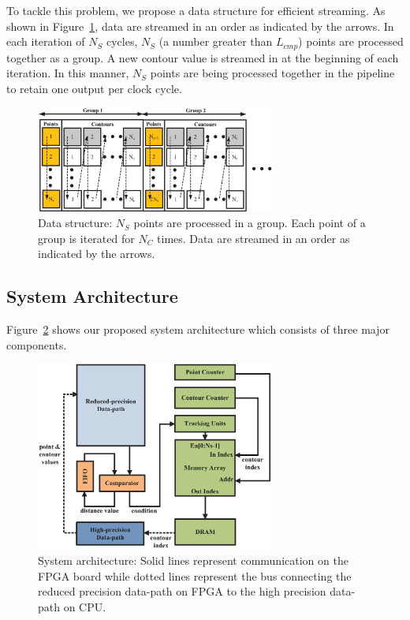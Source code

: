 To tackle this problem, we propose a data structure for efficient streaming.
As shown in Figure~\ref{fig:precision_stream}, data are streamed in an order as indicated by the arrows.
In each iteration of $N_S$ cycles, $N_{S}$ (a number greater than $L_{cmp}$) points are processed together as a group.
A new contour value is streamed in at the beginning of each iteration.
In this manner, $N_{S}$ points are being processed together in the pipeline to retain one output per clock cycle.

\begin{figure}[ht]
\begin{center}
\includegraphics[width=0.7\textwidth]{3_precision/figures/stream}
\end{center}
\caption{Data structure: 
$N_S$ points are processed in a group. 
Each point of a group is iterated for $N_C$ times.
Data are streamed in an order as indicated by the arrows.}
\label{fig:precision_stream}
\end{figure}

\subsection{System Architecture}
Figure~\ref{fig:precision_arch} shows our proposed system architecture which consists of three major components.

\begin{figure}[t!]
\begin{center}
\includegraphics[width=0.7\textwidth]{3_precision/figures/arch}
\end{center}
\caption{System architecture:
Solid lines represent communication on the FPGA board while dotted lines represent the bus connecting the reduced precision data-path on FPGA to the high precision data-path on CPU.
}
\label{fig:precision_arch}
\end{figure}

